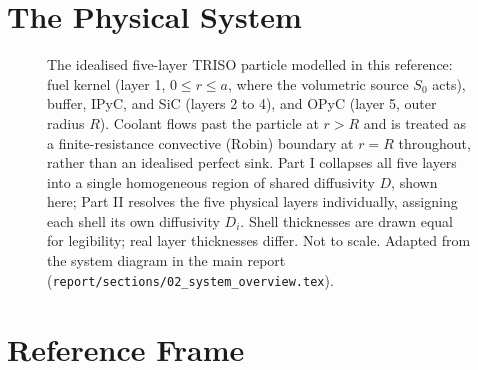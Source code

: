 \documentclass[11pt,a4paper]{article}
\begin{document}
\section*{The Physical System}
\begin{figure}[htbp]
  \centering
  \caption{The idealised five-layer TRISO particle modelled in this
  reference: fuel kernel (layer 1, $0\le r\le a$, where the volumetric source
  $S_0$ acts), buffer, IPyC, and SiC (layers 2 to 4), and OPyC (layer 5, outer
  radius $R$). Coolant flows past the particle at $r>R$ and is treated as a
  finite-resistance convective (Robin) boundary at $r=R$ throughout, rather
  than an idealised perfect sink. Part I collapses all five layers into a
  single homogeneous region of shared diffusivity $D$, shown here; Part II
  resolves the five physical layers individually, assigning each shell its
  own diffusivity $D_i$. Shell thicknesses are drawn equal for legibility;
  real layer thicknesses differ. Not to scale. Adapted from the system
  diagram in the main report
  (\texttt{report/sections/02\_system\_overview.tex}).}
  \label{fig:eq-particle}
\end{figure}
\FloatBarrier
\clearpage

\section*{Reference Frame}
\end{document}
